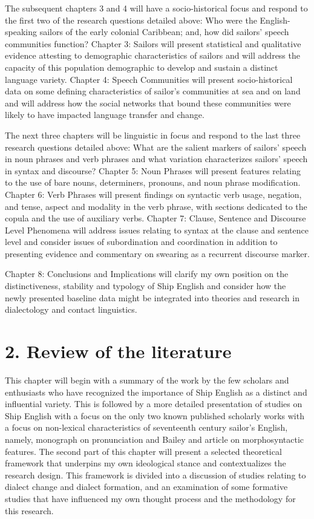   The subsequent chapters 3 and 4 will have a socio-historical focus and respond to the first two of the research questions detailed above: Who were the English-speaking sailors of the early colonial Caribbean; and, how did sailors’ speech communities function? Chapter 3: Sailors will present statistical and qualitative evidence attesting to demographic characteristics of sailors and will address the capacity of this population demographic to develop and sustain a distinct language variety. Chapter 4: Speech Communities will present socio-historical data on some defining characteristics of sailor’s communities at sea and on land and will address how the social networks that bound these communities were likely to have impacted language transfer and change.  



  The next three chapters will be linguistic in focus and respond to the last three research questions detailed above: What are the salient markers of sailors’ speech in noun phrases and verb phrases and what variation characterizes sailors’ speech in syntax and discourse? Chapter 5: Noun Phrases will present features relating to the use of bare nouns, determiners, pronouns, and noun phrase modification. Chapter 6: Verb Phrases will present findings on syntactic verb usage, negation, and tense, aspect and modality in the verb phrase, with sections dedicated to the copula and the use of auxiliary verbs. Chapter 7: Clause, Sentence and Discourse Level Phenomena will address issues relating to syntax at the clause and sentence level and consider issues of subordination and coordination in addition to presenting evidence and commentary on swearing as a recurrent discourse marker.



  Chapter 8: Conclusions and Implications will clarify my own position on the distinctiveness, stability and typology of Ship English and consider how the newly presented baseline data might be integrated into theories and research in dialectology and contact linguistics.


\chapter{\textbf{2.} \textbf{Review} \textbf{of} \textbf{the} \textbf{literature}}

  This chapter will begin with a summary of the work by the few scholars and enthusiasts who have recognized the importance of Ship English as a distinct and influential variety. This is followed by a more detailed presentation of studies on Ship English with a focus on the only two known published scholarly works with a focus on non-lexical characteristics of seventeenth century sailor’s English, namely,  monograph on pronunciation and Bailey and  article on morphosyntactic features. The second part of this chapter will present a selected theoretical framework that underpins my own ideological stance and contextualizes the research design. This framework is divided into a discussion of studies relating to dialect change and dialect formation, and an examination of some formative studies that have influenced my own thought process and the methodology for this research. 

